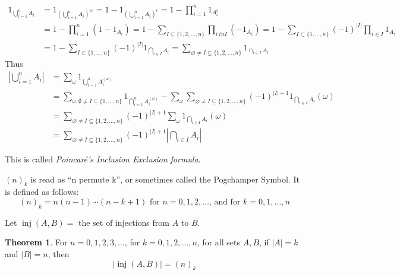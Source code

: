 \documentclass{article}
\DeclareMathOperator{\inj}{inj}
\newcommand{\p}[1]{\left(#1\right)} %
\theoremstyle{definition}
\newtheorem{theorem}{Theorem}
\begin{document}
\begin{align*}
    1_{\bigcup_{i=1}^nA_i} &= 1_{\p{\bigcup_{i=1}^nA_i}^{cc}} = 1 - 1_{\p{\bigcup_{i = 1}^n A_i}^c} = 1 - \prod_{i = 1}^n 1_{A_i^c} \\
        &= 1 - \prod_{i = 1}^n \p{1 - 1_{A_i}} = 1 - \sum_{I \subseteq \{1,2,\dots, n\}} \prod_{i\ in I} (-1_{A_{i}}) \tag{by GBT} = 1 - \sum_{I \subset \{1, \ldots, n\}} (-1)^{|I|} \prod_{i \in I} 1_{A_i}\\
        &= 1 - \sum_{I \subset \{1, \ldots, n\}} (-1)^{|I|} 1_{\bigcap_{i \in I} A_i} = \sum_{\varnothing \neq I \subseteq \{1,2,\dots, n\}} 1_{\cap_{i \in I} A_i}
\end{align*}
Thus
\begin{align*}
    \left|\bigcup_{i=1}^n A_i\right| &= \sum_{\omega} 1_{\bigcup_{i=1}^n A_i^{(\omega)}} \\
    &= \sum_{\omega, \emptyset\neq I\subseteq \{1, \dots, n\}} 1_{\bigcap_{i=1}^nA_i^{(\omega)}}
        - \sum_\omega \sum_{\varnothing \neq I \subseteq \{1,2,\dots, n\}} (-1)^{|I| + 1}1_{\bigcap_{i\in I} A_i} (\omega) \\
    &= \sum_{\varnothing \neq I \subseteq \{1,2,\dots, n\}}(-1)^{|I| + 1} \sum_{\omega} 1_{\bigcap_{i \in I} A_i}(\omega) \\
    &= \sum_{\varnothing \neq I \subseteq \{1,2,\dots, n\}} (-1)^{|I|+1}\left|\bigcap_{i\in I} A_i\right|
\end{align*}

This is called \emph{Poincar\'{e}'s Inclusion Exclusion formula}.

$(n)_k$ is read as ``n permute k'', or sometimes called the Pogchamper Symbol. It is defined as follows:
$$(n)_k = n(n - 1)\cdots(n - k + 1)\text{ for }n = 0, 1, 2, \dots\text{, and for }k = 0, 1, \dots, n$$

Let $\inj(A, B) = $ the set of injections from $A$ to $B$. 

\vspace{5mm}
\begin{theorem}
For $n = 0, 1, 2, 3, \dots$, for $k = 0, 1, 2, \dots, n$, for all sets $A, B$, if $|A| = k$ and $|B| = n$, then
$$|\inj(A,B)| = (n)_k$$
\end{theorem}
\end{document}
